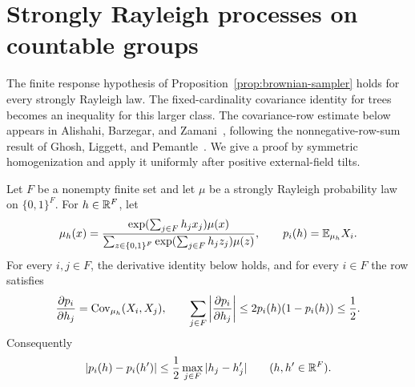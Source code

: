 \section{Strongly Rayleigh processes on countable groups}
\label{sec:strongly-rayleigh}

The finite response hypothesis of Proposition~\ref{prop:brownian-sampler}
holds for every strongly Rayleigh law. The fixed-cardinality covariance
identity for trees becomes an inequality for this larger class.
The covariance-row estimate below appears in Alishahi, Barzegar, and
Zamani~\cite[Lemma~2.5 and (1)]{AlishahiBarzegarZamani2023}, following the
nonnegative-row-sum result of Ghosh, Liggett, and
Pemantle~\cite[arXiv version, Lemma~3.2]{GhoshLiggettPemantle2017}.
We give a proof by symmetric homogenization and apply it uniformly after
positive external-field tilts.

\begin{lemma}\label{lem:sr-response}
Let $F$ be a nonempty finite set and let $\mu$ be a strongly Rayleigh
probability law on $\{0,1\}^F$. For $h\in\mathbb R^F$, let
\[
 \mu_h(x)=\frac{\exp(\sum_{j\in F}h_jx_j)\mu(x)}
 {\sum_{z\in\{0,1\}^F}\exp(\sum_{j\in F}h_jz_j)\mu(z)},
 \qquad p_i(h)=\mathbb E_{\mu_h}X_i.
\]
For every $i,j\in F$, the derivative identity below holds, and for every
$i\in F$ the row satisfies
\begin{equation}\label{eq:sr-covariance-row}
 \frac{\partial p_i}{\partial h_j}
 =\operatorname{Cov}_{\mu_h}(X_i,X_j),
 \qquad
 \sum_{j\in F}\left|\frac{\partial p_i}{\partial h_j}\right|
 \le 2p_i(h)(1-p_i(h))\le\frac12.
\end{equation}
Consequently
\begin{equation}\label{eq:sr-response}
 |p_i(h)-p_i(h')|\le\frac12\max_{j\in F}|h_j-h'_j|
 \qquad(h,h'\in\mathbb R^F).
\end{equation}
\end{lemma}


